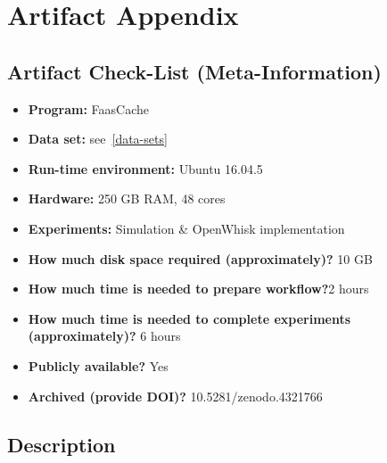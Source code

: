 %
%
%
%
%

\section{Artifact Appendix}
\label{sec:artifact-appendix}


\subsection{Artifact Check-List (Meta-Information)}

\begin{itemize}
  \item {\bf Program:} FaasCache
  \item {\bf Data set:}  see~\ref{data-sets}
  \item {\bf Run-time environment:} Ubuntu 16.04.5
  \item {\bf Hardware:} 250 GB RAM, 48 cores
  \item {\bf Experiments:} Simulation \& OpenWhisk implementation
  \item {\bf How much disk space required (approximately)?} 10 GB
  \item {\bf How much time is needed to prepare workflow?}2 hours
  \item {\bf How much time is needed to complete experiments (approximately)?} 6 hours
  \item {\bf Publicly available?} Yes
  \item {\bf Archived (provide DOI)?} 10.5281/zenodo.4321766
\end{itemize}

\subsection{Description}

